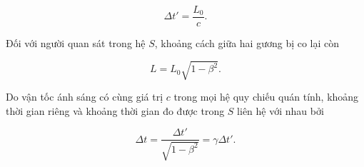 \begin{enumerate}[label=(\alph*)]
\begin{equation}
\Delta t'=\frac{L_0}{c}.
\end{equation}

Đối với người quan sát trong hệ \(S\), khoảng cách giữa hai gương bị co lại còn

\begin{equation}
L=L_0\sqrt{1-\beta^2}.
\end{equation}

Do vận tốc ánh sáng có cùng giá trị \(c\) trong mọi hệ quy chiếu quán tính, khoảng thời gian riêng và khoảng thời gian đo được trong \(S\) liên hệ với nhau bởi

\begin{equation}
\Delta t=\frac{\Delta t'}{\sqrt{1-\beta^2}}
=\gamma\Delta t'.
\end{equation}

\end{enumerate}

